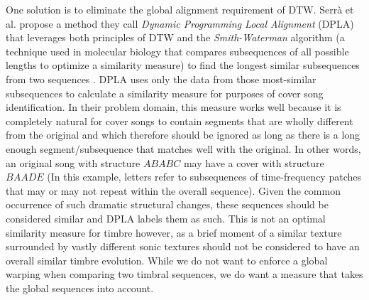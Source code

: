 \documentclass[a4paper,12pt]{report} 	%
\numberwithin{figure}{chapter}
\numberwithin{table}{chapter}
\numberwithin{equation}{chapter}
\begin{document}
\begin{flushleft}
One solution is to eliminate the global alignment requirement of DTW. Serr\`a et al. propose a method they call \emph{Dynamic Programming Local Alignment} (DPLA) that leverages both principles of DTW and the \emph{Smith-Waterman} algorithm (a technique used in molecular biology that compares subsequences of all possible lengths to optimize a similarity measure) to find the longest similar subsequences from two sequences \cite{serra2008chroma}. DPLA uses only the data from those most-similar subsequences to calculate a similarity measure for purposes of cover song identification. In their problem domain, this measure works well because it is completely natural for cover songs to contain segments that are wholly different from the original and which therefore should be ignored as long as there is a long enough segment/subsequence that matches well with the original. In other words, an original song with structure $ABABC$ may have a cover with structure $BAADE$ (In this example, letters refer to subsequences of time-frequency patches that may or may not repeat within the overall sequence). Given the common occurrence of such dramatic structural changes, these sequences should be considered similar and DPLA labels them as such. This is not an optimal similarity measure for timbre however, as a brief moment of a similar texture surrounded by vastly different sonic textures should not be considered to have an overall similar timbre evolution. While we do not want to enforce a global warping when comparing two timbral sequences, we do want a measure that takes the global sequences into account.


\end{flushleft}
\end{document}

